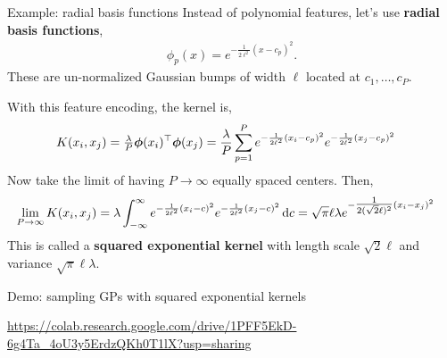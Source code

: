 \documentclass[aspectratio=169]{beamer}
\begin{document}
\begin{frame}{Example: radial basis functions}
Instead of polynomial features, let's use \textbf{radial basis functions},
\begin{align}
    \phi_p(x) = e^{-\frac{1}{2\ell^2}( x-c_p )^2}.
\end{align}
These are un-normalized Gaussian bumps of width $\ell$ located at $c_1,\ldots,c_P$.

With this feature encoding, the kernel is,
\begin{align}
    K(x_i, x_j) = \tfrac{\lambda}{P} \boldsymbol{\phi}(x_i)^\top \boldsymbol{\phi}(x_j) 
    &= \frac{\lambda}{P} \sum_{p=1}^P e^{-\frac{1}{2\ell^2}(x_i-c_p)^2} e^{-\frac{1}{2\ell^2} (x_j-c_p)^2} 
\end{align}
Now take the limit of having $P \to \infty$ equally spaced centers. Then,
\begin{align}
    \lim_{P \to \infty} K(x_i, x_j) 
    &= \lambda \int_{-\infty}^\infty e^{-\frac{1}{2\ell^2} (x_i-c)^2} e^{-\frac{1}{2\ell^2} ( x_j-c)^2} \mathop{}\!\mathrm{d} c
    = \sqrt{\pi} \ell \lambda e^{-\tfrac{1}{2 (\sqrt{2} \ell)^2} (x_i - x_j)^2}
\end{align}
This is called a \textbf{squared exponential kernel} with length scale $\sqrt{2} \ell$ and variance $\sqrt{\pi} \ell \lambda$.
\end{frame}

\begin{frame}{Demo: sampling GPs with squared exponential kernels}
    
\begin{center}
    \url{https://colab.research.google.com/drive/1PFF5EkD-6g4Ta_4oU3y5ErdzQKh0T1lX?usp=sharing}
\end{center}
    
\end{frame}
\end{document}
